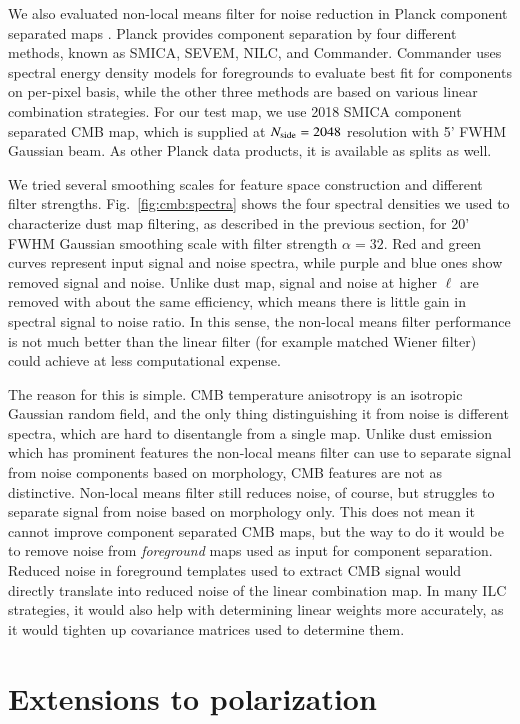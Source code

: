 \documentclass{aa}
\newcommand{\nside}{\ensuremath N_{\text{side}}}
\begin{document}
We also evaluated non-local means filter for noise reduction in Planck component separated maps \citep{2020A&A...641A...4P}. Planck provides component separation by four different methods, known as SMICA, SEVEM, NILC, and Commander. Commander uses spectral energy density models for foregrounds to evaluate best fit for components on per-pixel basis, while the other three methods are based on various linear combination strategies. For our test map, we use 2018 SMICA component separated CMB map, which is supplied at $\nside=2048$ resolution with 5' FWHM Gaussian beam. As other Planck data products, it is available as splits as well.

We tried several smoothing scales for feature space construction and different filter strengths. Fig.~\ref{fig:cmb:spectra} shows the four spectral densities we used to characterize dust map filtering, as described in the previous section, for 20' FWHM Gaussian smoothing scale with filter strength $\alpha=32$. Red and green curves represent input signal and noise spectra, while purple and blue ones show removed signal and noise. Unlike dust map, signal and noise at higher $\ell$ are removed with about the same efficiency, which means there is little gain in spectral signal to noise ratio. In this sense, the non-local means filter performance is not much better than the linear filter (for example matched Wiener filter) could achieve at less computational expense.

The reason for this is simple. CMB temperature anisotropy is an isotropic Gaussian random field, and the only thing distinguishing it from noise is different spectra, which are hard to disentangle from a single map. Unlike dust emission which has prominent features the non-local means filter can use to separate signal from noise components based on morphology, CMB features are not as distinctive. Non-local means filter still reduces noise, of course, but struggles to separate signal from noise based on morphology only. This does not mean it cannot improve component separated CMB maps, but the way to do it would be to remove noise from \textit{foreground} maps used as input for component separation. Reduced noise in foreground templates used to extract CMB signal would directly translate into reduced noise of the linear combination map. In many ILC strategies, it would also help with determining linear weights more accurately, as it would tighten up covariance matrices used to determine them.


\section{Extensions to polarization}
\label{sec:polar}
\end{document}

